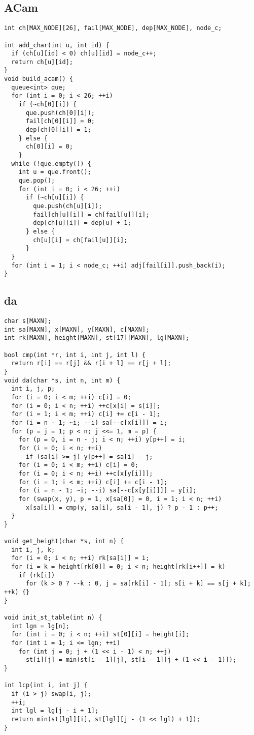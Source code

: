 \documentclass[twoside]{article}
\begin{document}
\subsection{ACam}
\begin{lstlisting}
int ch[MAX_NODE][26], fail[MAX_NODE], dep[MAX_NODE], node_c;

int add_char(int u, int id) {
  if (ch[u][id] < 0) ch[u][id] = node_c++;
  return ch[u][id];
}
void build_acam() {
  queue<int> que;
  for (int i = 0; i < 26; ++i)
    if (~ch[0][i]) {
      que.push(ch[0][i]);
      fail[ch[0][i]] = 0;
      dep[ch[0][i]] = 1;
    } else {
      ch[0][i] = 0;
    }
  while (!que.empty()) {
    int u = que.front();
    que.pop();
    for (int i = 0; i < 26; ++i)
      if (~ch[u][i]) {
        que.push(ch[u][i]);
        fail[ch[u][i]] = ch[fail[u]][i];
        dep[ch[u][i]] = dep[u] + 1;
      } else {
        ch[u][i] = ch[fail[u]][i];
      }
  }
  for (int i = 1; i < node_c; ++i) adj[fail[i]].push_back(i);
}

\end{lstlisting}
\subsection{da}
\begin{lstlisting}
char s[MAXN];
int sa[MAXN], x[MAXN], y[MAXN], c[MAXN];
int rk[MAXN], height[MAXN], st[17][MAXN], lg[MAXN];

bool cmp(int *r, int i, int j, int l) {
  return r[i] == r[j] && r[i + l] == r[j + l];
}
void da(char *s, int n, int m) {
  int i, j, p;
  for (i = 0; i < m; ++i) c[i] = 0;
  for (i = 0; i < n; ++i) ++c[x[i] = s[i]];
  for (i = 1; i < m; ++i) c[i] += c[i - 1];
  for (i = n - 1; ~i; --i) sa[--c[x[i]]] = i;
  for (p = j = 1; p < n; j <<= 1, m = p) {
    for (p = 0, i = n - j; i < n; ++i) y[p++] = i;
    for (i = 0; i < n; ++i)
      if (sa[i] >= j) y[p++] = sa[i] - j;
    for (i = 0; i < m; ++i) c[i] = 0;
    for (i = 0; i < n; ++i) ++c[x[y[i]]];
    for (i = 1; i < m; ++i) c[i] += c[i - 1];
    for (i = n - 1; ~i; --i) sa[--c[x[y[i]]]] = y[i];
    for (swap(x, y), p = 1, x[sa[0]] = 0, i = 1; i < n; ++i)
      x[sa[i]] = cmp(y, sa[i], sa[i - 1], j) ? p - 1 : p++;
  }
}

void get_height(char *s, int n) {
  int i, j, k;
  for (i = 0; i < n; ++i) rk[sa[i]] = i;
  for (i = k = height[rk[0]] = 0; i < n; height[rk[i++]] = k)
    if (rk[i])
      for (k > 0 ? --k : 0, j = sa[rk[i] - 1]; s[i + k] == s[j + k]; ++k) {}
}

void init_st_table(int n) {
  int lgn = lg[n];
  for (int i = 0; i < n; ++i) st[0][i] = height[i];
  for (int i = 1; i <= lgn; ++i)
    for (int j = 0; j + (1 << i - 1) < n; ++j)
      st[i][j] = min(st[i - 1][j], st[i - 1][j + (1 << i - 1)]);
}

int lcp(int i, int j) {
  if (i > j) swap(i, j);
  ++i;
  int lgl = lg[j - i + 1];
  return min(st[lgl][i], st[lgl][j - (1 << lgl) + 1]);
}

\end{lstlisting}
\end{document}
